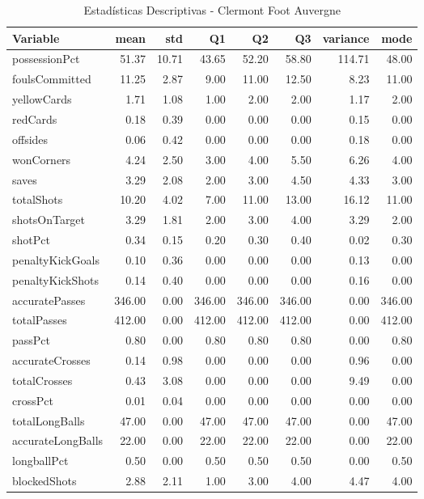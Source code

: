 \begin{table}[H]
\centering
\caption{Estadísticas Descriptivas - Clermont Foot Auvergne}
\label{tab:fra_clermont_foot}
\small
\begin{tabular}{lrrrrrrr}
\hline
Variable & mean & std & Q1 & Q2 & Q3 & variance & mode \\
\hline
possessionPct & 51.37 & 10.71 & 43.65 & 52.20 & 58.80 & 114.71 & 48.00 \\
foulsCommitted & 11.25 & 2.87 & 9.00 & 11.00 & 12.50 & 8.23 & 11.00 \\
yellowCards & 1.71 & 1.08 & 1.00 & 2.00 & 2.00 & 1.17 & 2.00 \\
redCards & 0.18 & 0.39 & 0.00 & 0.00 & 0.00 & 0.15 & 0.00 \\
offsides & 0.06 & 0.42 & 0.00 & 0.00 & 0.00 & 0.18 & 0.00 \\
wonCorners & 4.24 & 2.50 & 3.00 & 4.00 & 5.50 & 6.26 & 4.00 \\
saves & 3.29 & 2.08 & 2.00 & 3.00 & 4.50 & 4.33 & 3.00 \\
totalShots & 10.20 & 4.02 & 7.00 & 11.00 & 13.00 & 16.12 & 11.00 \\
shotsOnTarget & 3.29 & 1.81 & 2.00 & 3.00 & 4.00 & 3.29 & 2.00 \\
shotPct & 0.34 & 0.15 & 0.20 & 0.30 & 0.40 & 0.02 & 0.30 \\
penaltyKickGoals & 0.10 & 0.36 & 0.00 & 0.00 & 0.00 & 0.13 & 0.00 \\
penaltyKickShots & 0.14 & 0.40 & 0.00 & 0.00 & 0.00 & 0.16 & 0.00 \\
accuratePasses & 346.00 & 0.00 & 346.00 & 346.00 & 346.00 & 0.00 & 346.00 \\
totalPasses & 412.00 & 0.00 & 412.00 & 412.00 & 412.00 & 0.00 & 412.00 \\
passPct & 0.80 & 0.00 & 0.80 & 0.80 & 0.80 & 0.00 & 0.80 \\
accurateCrosses & 0.14 & 0.98 & 0.00 & 0.00 & 0.00 & 0.96 & 0.00 \\
totalCrosses & 0.43 & 3.08 & 0.00 & 0.00 & 0.00 & 9.49 & 0.00 \\
crossPct & 0.01 & 0.04 & 0.00 & 0.00 & 0.00 & 0.00 & 0.00 \\
totalLongBalls & 47.00 & 0.00 & 47.00 & 47.00 & 47.00 & 0.00 & 47.00 \\
accurateLongBalls & 22.00 & 0.00 & 22.00 & 22.00 & 22.00 & 0.00 & 22.00 \\
longballPct & 0.50 & 0.00 & 0.50 & 0.50 & 0.50 & 0.00 & 0.50 \\
blockedShots & 2.88 & 2.11 & 1.00 & 3.00 & 4.00 & 4.47 & 4.00 \\

\end{tabular}
\end{table}
